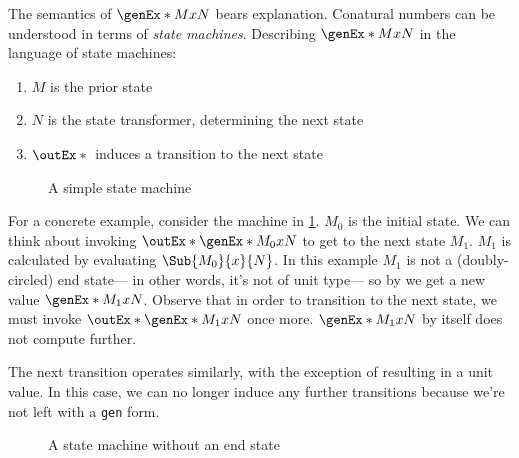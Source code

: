 \documentclass[letterpaper]{article}
\begin{document}
\noindent
The semantics of $\genEx*{M}{x}{N}$ bears explanation. Conatural numbers can be
understood in terms of \textit{state machines}. Describing $\genEx*{M}{x}{N}$
in the language of state machines:

\begin{enumerate}
    \item $M$ is the prior state
    \item $N$ is the state transformer, determining the next state
    \item $\outEx*{}$ induces a transition to the next state
\end{enumerate}

\begin{figure}[h]
\begin{center}
\end{center}
\caption{A simple state machine}
\label{fig:state-machine-1}
\end{figure}

For a concrete example, consider the machine in \ref{fig:state-machine-1}.
$M_0$ is the initial state. We can think about invoking
$\outEx*{\genEx*{M_0}{x}{N}}$ to get to the next state $M_1$. $M_1$ is
calculated by evaluating $\Sub{M_0}{x}{N}$. In this example $M_1$ is not a
(doubly-circled) end state--- in other words, it's not of unit type--- so by
 we get a new value $\genEx*{M_1}{x}{N}$. Observe that in
order to transition to the next state, we must invoke
$\outEx*{\genEx*{M_1}{x}{N}}$ once more. $\genEx*{M_1}{x}{N}$ by itself does
not compute further.

The next transition operates similarly, with the exception of resulting in a
unit value. In this case, we can no longer induce any further transitions
because we're not left with a \texttt{gen} form.

\begin{figure}[h]
\begin{center}
\end{center}
\caption{A state machine without an end state}
\label{fig:state-machine-2}
\end{figure}
\end{document}
